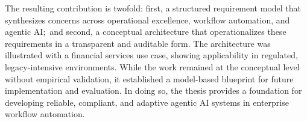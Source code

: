 The resulting contribution is twofold: first, a structured requirement model that synthesizes concerns across operational excellence, workflow automation, and agentic AI;~and second, a conceptual architecture that operationalizes these requirements in a transparent and auditable form. The architecture was illustrated with a financial services use case, showing applicability in regulated, legacy-intensive environments. While the work remained at the conceptual level without empirical validation, it established a model-based blueprint for future implementation and evaluation. In doing so, the thesis provides a foundation for developing reliable, compliant, and adaptive agentic AI systems in enterprise workflow automation.
\newpage


\clearpage
\tableofcontents \clearpage

{}
\listoffigures
\clearpage

\renewcommand{\nomname}{Abbreviations}
\setlength{\nomlabelwidth}{.25\hsize}
\renewcommand{\nomlabel}[1]{#1 \dotfill}
\setlength{\nomitemsep}{-\parsep}
{\small \printnomenclature}
\clearpage
{}